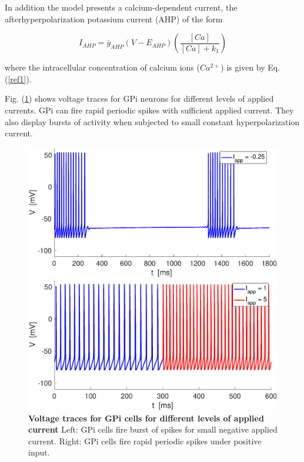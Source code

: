 In addition the model presents a calcium-dependent current, the afterhyperpolarization potassium current (AHP) of the form

\begin{equation}
    I_{AHP} = \bar{g}_{AHP}(V-E_{AHP})\left(\frac{[Ca]}{[Ca]+k_{1}} \right)
\end{equation}

where the intracellular concentration of calcium ions ($Ca^{2+}$) is given by Eq. (\ref{ref1}).

Fig. (\ref{photo2}) shows voltage traces for GPi neurons for different levels of applied currents. GPi can fire rapid periodic spikes with sufficient applied current. They also display bursts of activity when subjected to small constant hyperpolarization current.

\begin{figure}[h]
  \begin{minipage}{0.5\linewidth}
  \begin{center}
\includegraphics[width=1\linewidth]{Images/photo2_1.eps}
\end{center}
  \end{minipage} 
  \begin{minipage}{0.5\linewidth}
  \begin{center}
\includegraphics[width=1\linewidth]{Images/photo2_2.eps}
\end{center}
  \end{minipage} 
  \caption{\textbf{Voltage traces for GPi cells for different levels of applied current} Left: GPi cells fire burst of spikes for small negative applied current. Right: GPi cells fire rapid periodic spikes under positive input.}
  \label{photo2}
\end{figure}


